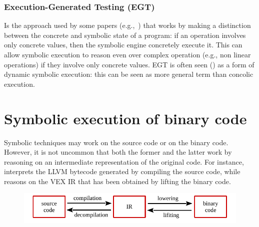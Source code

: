 \subsubsection{Execution-Generated Testing (EGT)} 
Is the approach used by some papers (e.g.,~\cite{KLEE-OSDI08,EXE-CCS06}) that works by making a distinction between the concrete and symbolic state of a program: if an operation involves only concrete values, then the symbolic engine concretely execute it. This can allow symbolic execution to reason even over complex operation (e.g., non linear operations) if they involve only concrete values. EGT is often seen (\cite{CS-CACM13}) as a form of dynamic symbolic execution: this can be seen as more general term than concolic execution.


\section{Symbolic execution of binary code}

Symbolic techniques may work on the source code or on the binary code. However, it is not uncommon that both the former and the latter work by reasoning on an intermediate representation of the original code. For instance, ~\cite{KLEE-OSDI08} interprets the LLVM bytecode generated by compiling the source code, while~\cite{ANGR-SP16} reasons on the VEX IR that has been obtained by lifting the binary code.

\begin{figure}[h!]
  \centering
  \includegraphics[width=.7\columnwidth]{images/compiler} 
\end{figure}


